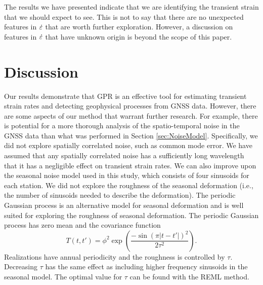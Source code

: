\documentclass[extra,mreferee]{gji}
\begin{document}

The results we have presented indicate that we are identifying the
transient strain that we should expect to see. This is not to say that
there are no unexpected features in $\dot\varepsilon$ that are worth further
exploration. However, a discussion on features in $\dot\varepsilon$ that have
unknown origin is beyond the scope of this paper.

\section{Discussion}\label{sec:Discussion}


Our results demonstrate that GPR is an effective tool for estimating
transient strain rates and detecting geophysical processes from GNSS
data. However, there are some aspects of our method that warrant
further research. For example, there is potential for a more thorough
analysis of the spatio-temporal noise in the GNSS data than what was
performed in Section \ref{sec:NoiseModel}. Specifically, we did not
explore spatially correlated noise, such as common mode error. We
have assumed that any spatially correlated noise has a sufficiently
long wavelength that it has a negligible effect on transient strain
rates. We can also improve upon the seasonal noise model used in this
study, which consists of four sinusoids for each station. We did not
explore the roughness of the seasonal deformation (i.e., the number of
sinusoids needed to describe the deformation). The periodic Gaussian
process \citep{Mackay1998} is an alternative model for seasonal
deformation and is well suited for exploring the roughness of seasonal
deformation.  The periodic Gaussian process has zero mean and the
covariance function
\begin{equation}\label{eq:Periodic}
  T(t,t') = \phi^2 \exp\left(\frac{-\sin(\pi|t - t'|)^2}{2\tau^2}\right). 
\end{equation}
Realizations have annual periodicity and the roughness is controlled
by $\tau$. Decreasing $\tau$ has the same effect as including higher
frequency sinusoids in the seasonal model. The optimal value for
$\tau$ can be found with the REML method.

\end{document}
